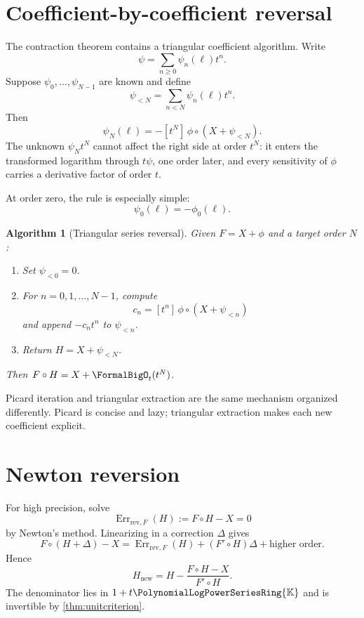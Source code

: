 \documentclass[11pt,oneside,openany]{book}
\newtheorem{algorithm}[theorem]{Algorithm}
\newcommand{\K}{\mathbb{K}}
\newcommand{\Rring}{\PolynomialLogPowerSeriesRing{\K}}
\newcommand{\compose}{\mathbin{\circ}}
\newcommand{\ReversionResidual}[1]{%
  \operatorname{Err}_{\mathrm{rev},F}\!\left(#1\right)%
}
\begin{document}
\section{Coefficient-by-coefficient reversal}
The contraction theorem contains a triangular coefficient algorithm.  Write
\begin{equation}\label{eq:psicoeff}
 \psi=\sum_{n\geq0}\psi_n(\ell)t^n.
\end{equation}
Suppose \(\psi_0,\ldots,\psi_{N-1}\) are known and define
\[
 \psi_{<N}=\sum_{n<N}\psi_n(\ell)t^n.
\]
Then
\begin{equation}\label{eq:reversioncoefficient}
 \psi_N(\ell)
 =-[t^N]\,\phi\compose(X+\psi_{<N}).
\end{equation}
The unknown \(\psi_Nt^N\) cannot affect the right side at order \(t^N\): it
enters the transformed logarithm through \(t\psi\), one order later, and every
sensitivity of \(\phi\) carries a derivative factor of order \(t\).

At order zero, the rule is especially simple:
\begin{equation}\label{eq:psi0}
 \psi_0(\ell)=-\phi_0(\ell).
\end{equation}

\begin{algorithm}[Triangular series reversal]\label{alg:triangularreverse}
Given \(F=X+\phi\) and a target order \(N\):
\begin{enumerate}
\item Set \(\psi_{<0}=0\).
\item For \(n=0,1,\ldots,N-1\), compute
\[
 c_n=[t^n]\,\phi\compose(X+\psi_{<n})
\]
and append \(-c_nt^n\) to \(\psi_{<n}\).
\item Return \(H=X+\psi_{<N}\).
\end{enumerate}
Then \(F\compose H=X+\FormalBigO_t(t^N)\).
\end{algorithm}

Picard iteration and triangular extraction are the same mechanism organized
differently.  Picard is concise and lazy; triangular extraction makes each
new coefficient explicit.

\section{Newton reversion}
For high precision, solve
\[
 \ReversionResidual{H}:=F\compose H-X=0
\]
by Newton's method.  Linearizing in a correction \(\Delta\) gives
\[
 F\compose(H+\Delta)-X
 =\ReversionResidual{H}+(F'\compose H)\Delta+\text{higher order}.
\]
Hence
\begin{equation}\label{eq:newtonreversion}
 H_{\mathrm{new}}
 =H-\frac{F\compose H-X}{F'\compose H}.
\end{equation}
The denominator lies in \(1+t\Rring\) and is invertible by
\cref{thm:unitcriterion}.
\end{document}
